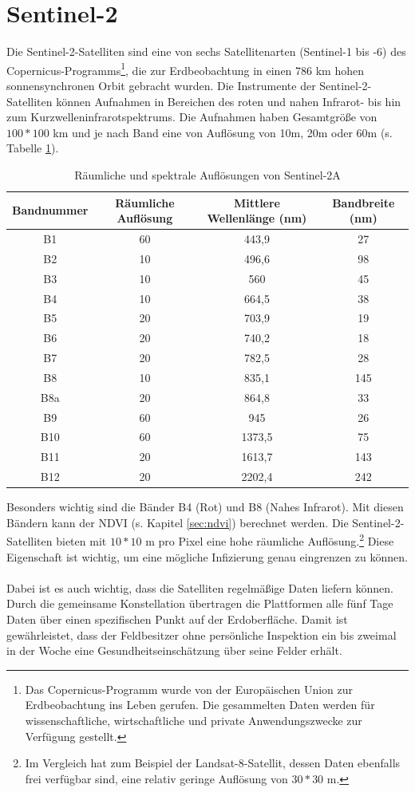 \section{Sentinel-2}\label{sec:sentinel2}

Die Sentinel-2-Satelliten sind eine von sechs Satellitenarten (Sentinel-1 bis -6) des Copernicus-Programms\footnote{Das Copernicus-Programm wurde von der Europäischen Union zur Erdbeobachtung ins Leben gerufen. Die gesammelten Daten werden für wissenschaftliche, wirtschaftliche und private Anwendungszwecke zur Verfügung gestellt.\cite{ref:copernicus}}, die zur Erdbeobachtung in einen 786 km hohen sonnensynchronen Orbit gebracht wurden. Die Instrumente der Sentinel-2-Satelliten können Aufnahmen in Bereichen des roten und nahen Infrarot- bis hin zum Kurzwelleninfrarotspektrums. Die Aufnahmen haben Gesamtgröße von $100*100$ km und je nach Band eine von Auflösung von 10m, 20m oder 60m (s. Tabelle \ref{tab:resolutions}).

\begin{table}[ht]
\begin{tabular}{c|c|c|c}
Bandnummer & Räumliche Auflösung & Mittlere Wellenlänge (nm) & Bandbreite (nm) \\
\hline
B1 & 60 & 443,9 & 27\\
B2 & 10 & 496,6 & 98\\
B3 & 10 & 560 & 45\\
B4 & 10 & 664,5 & 38\\
B5 & 20 & 703,9 & 19\\
B6 & 20 & 740,2 & 18\\
B7 & 20 & 782,5 & 28\\
B8 & 10 & 835,1 & 145\\
B8a & 20 & 864,8 & 33\\
B9 & 60 & 945 & 26\\
B10 & 60 & 1373,5 & 75\\
B11 & 20 & 1613,7 & 143\\
B12 & 20 & 2202,4 & 242\\
\end{tabular}
\caption{Räumliche und spektrale Auflösungen von Sentinel-2A\cite{ref:sentinel:radiores}}\label{tab:resolutions}
\end{table}
\noindent
Besonders wichtig sind die Bänder B4 (Rot) und B8 (Nahes Infrarot). Mit diesen Bändern kann der NDVI (s. Kapitel \ref{sec:ndvi}) berechnet werden.\cite{ref:sentinel:ndvi} Die Sentinel-2-Satelliten bieten mit $10*10$ m pro Pixel eine hohe räumliche Auflösung.\footnote{Im Vergleich hat zum Beispiel der Landsat-8-Satellit, dessen Daten ebenfalls frei verfügbar sind, eine relativ geringe Auflösung von $30*30$ m.\cite{ref:landsat}} Diese Eigenschaft ist wichtig, um eine mögliche Infizierung genau eingrenzen zu können.\\\\
Dabei ist es auch wichtig, dass die Satelliten regelmäßige Daten liefern können. Durch die gemeinsame Konstellation übertragen die Plattformen alle fünf Tage Daten über einen spezifischen Punkt auf der Erdoberfläche.\cite{ref:sentinel:resolutions} Damit ist gewährleistet, dass der Feldbesitzer ohne persönliche Inspektion ein bis zweimal in der Woche eine Gesundheitseinschätzung über seine Felder erhält.

